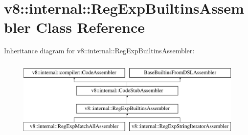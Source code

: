 \hypertarget{classv8_1_1internal_1_1RegExpBuiltinsAssembler}{}\section{v8\+:\+:internal\+:\+:Reg\+Exp\+Builtins\+Assembler Class Reference}
\label{classv8_1_1internal_1_1RegExpBuiltinsAssembler}
Inheritance diagram for v8\+:\+:internal\+:\+:Reg\+Exp\+Builtins\+Assembler\+:\begin{figure}[H]
\begin{center}
\leavevmode
\includegraphics[height=4.000000cm]{classv8_1_1internal_1_1RegExpBuiltinsAssembler}
\end{center}
\end{figure}
